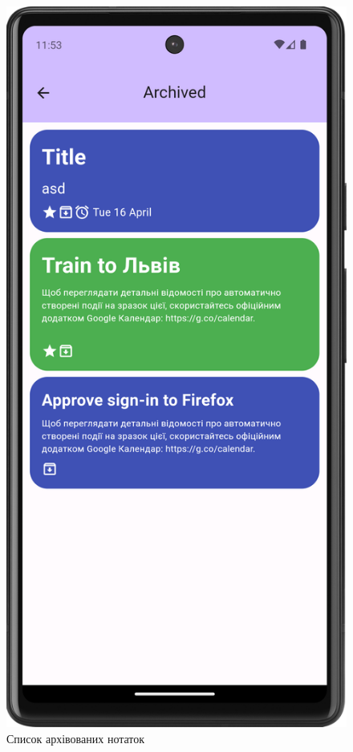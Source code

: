 \documentclass[oneside,14pt]{extarticle}
\begin{document}
\begin{normalsize}
	\begin{figure}[H]
		\begin{minipage}{0.48\textwidth}
			\centering
			\includegraphics[scale=0.12]{7}
			\caption{Список архівованих нотаток}

\end{minipage}
\end{figure}
\end{normalsize}
\end{document}
